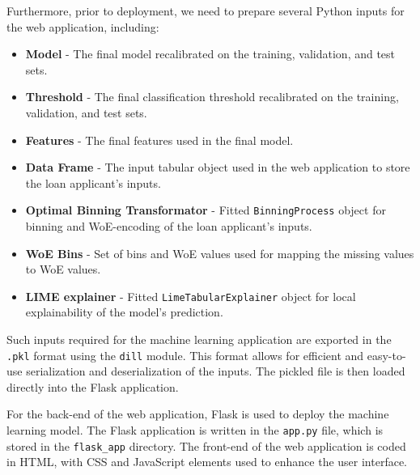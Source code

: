 Furthermore, prior to deployment, we need to prepare several Python inputs for the web application, including:
\begin{itemize}\setlength\itemsep{0em}
\item \textbf{Model} - The final model recalibrated on the training, validation, and test sets.
\item \textbf{Threshold} - The final classification threshold recalibrated on the training, validation, and test sets.
\item \textbf{Features} - The final features used in the final model.
\item \textbf{Data Frame} - The input tabular object used in the web application to store the loan applicant's inputs.
\item \textbf{Optimal Binning Transformator} - Fitted \lstinline{BinningProcess} object for binning and WoE-encoding of the loan applicant's inputs.
\item \textbf{WoE Bins} - Set of bins and WoE values used for mapping the missing values to WoE values.
\item \textbf{LIME explainer} - Fitted \lstinline{LimeTabularExplainer} object for local explainability of the model's prediction.
\end{itemize}


Such inputs required for the machine learning application are exported in the \lstinline{.pkl} format using the \lstinline{dill} module. This format allows for efficient and easy-to-use serialization and deserialization of the inputs. The pickled file is then loaded directly into the Flask application.


For the back-end of the web application, Flask is used to deploy the machine learning model. The Flask application is written in the \lstinline{app.py} file, which is stored in the \lstinline{flask_app} directory. The front-end of the web application is coded in HTML, with CSS and JavaScript elements used to enhance the user interface.


